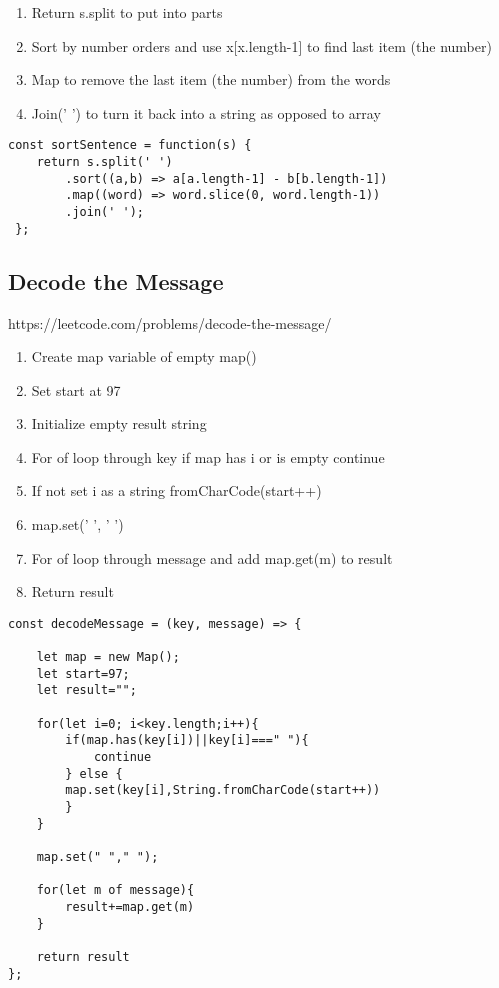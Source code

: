 \documentclass[10pt]{article}
\begin{document}
\begin{enumerate}
	\item Return s.split to put into parts
	\item Sort by number orders and use x[x.length-1] to find last item (the number)
	\item Map to remove the last item (the number) from the words
	\item Join(' ') to turn it back into a string as opposed to array
\end{enumerate}

\begin{lstlisting}[title=Solution sortSentence, captionpos=t]
const sortSentence = function(s) {
    return s.split(' ')
        .sort((a,b) => a[a.length-1] - b[b.length-1])
        .map((word) => word.slice(0, word.length-1))
        .join(' ');
 };
\end{lstlisting}
\medskip %


\pagebreak %
\medskip 
\subsection{Decode the Message}
https://leetcode.com/problems/decode-the-message/

\begin{enumerate}
	\item Create map variable of empty map()
	\item Set start at 97
	\item Initialize empty result string
	\item For of loop through key if map has i or is empty continue 
	\item If not set i as a string fromCharCode(start++)
	\item map.set(' ', ' ')
	\item For of loop through message and add map.get(m) to result
	\item Return result
\end{enumerate}

\begin{lstlisting}[title=Solution decodeMessage, captionpos=t]
const decodeMessage = (key, message) => {
    
    let map = new Map();
    let start=97;
    let result="";

    for(let i=0; i<key.length;i++){
        if(map.has(key[i])||key[i]===" "){
            continue
        } else {
        map.set(key[i],String.fromCharCode(start++)) 
        }
    }
    
    map.set(" "," "); 
    
    for(let m of message){
        result+=map.get(m)
    }
    
    return result
};
\end{lstlisting}
\medskip %
\end{document}
